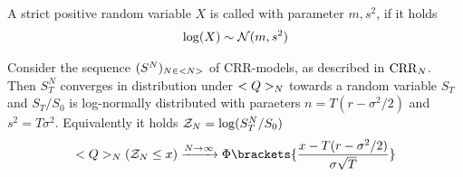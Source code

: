 \begin{definition}
	A strict positive random variable $X$ is called  with parameter $m, s^2$, if it holds
	\begin{align*}
		\log(X) \sim \mathcal{N}(m,s^2)
	\end{align*}
\end{definition}
\begin{theorem}
	Consider the sequence $(S^N)_{N \in <N>}$ of CRR-models, as described in $\operatorname{CRR}_N$. Then $S_T^N$ converges in distribution under $<Q>_N$ towards a random variable $S_T$ and $S_T/S_0$ is log-normally distributed with paraeters $n = T(r - \sigma^2/2)$ and $s^2 = T\sigma^2$. Equivalently it holds $\mathcal{Z}_N = \log(S_T^N / S_0)$
	\begin{align*}
		\QQ_N(\ZZ_N \le x) \xrightarrow{N \to \infty} \Phi\brackets{\frac{x-T(r-\sigma^2/2)}{\sigma\sqrt{T}}}
	\end{align*}
\end{theorem}

